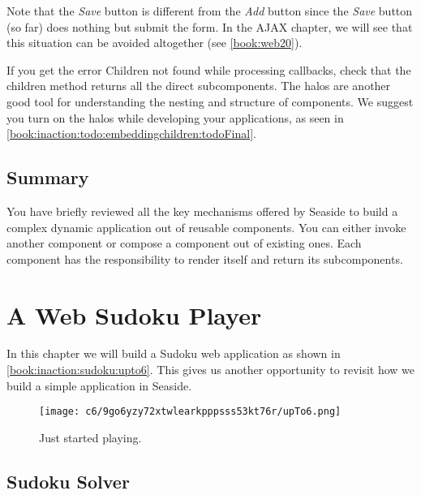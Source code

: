 \documentclass[a4paper,10pt,twoside]{book}
\newcommand{\ct}[1]{{\small\ttfamily\textup{#1}}}
\begin{document}
   
Note that the \textit{Save} button is different from the \textit{Add} button since the \textit{Save} button (so far) does nothing but submit the form. In the AJAX chapter, we will see that this situation can be avoided altogether (see \autoref{book:web20}).

If you get the error Children not found while processing callbacks, check that the \ct{children} method returns all the direct subcomponents. The halos are another good tool for understanding the nesting and structure of components. We suggest you turn on the halos while developing your applications, as seen in \autoref{book:inaction:todo:embeddingchildren:todoFinal}.

\section{Summary}
\label{book:inaction:todo:summary}

You have briefly reviewed all the key mechanisms offered by Seaside to build a complex dynamic application out of reusable components. You can either invoke another component or compose a component out of existing ones. Each component has the responsibility to render itself and return its subcomponents.

\chapter{A Web Sudoku Player}
\label{book:inaction:sudoku}

In this chapter we will build a Sudoku web application as shown in \autoref{book:inaction:sudoku:upto6}. This gives us another opportunity to revisit how we build a simple application in Seaside.

\begin{figure}[h!tbp]
	\begin{center}
		\texttt{[image: c6/9go6yzy72xtwlearkpppsss53kt76r/upTo6.png]}
		\caption{Just started playing.\label{book:inaction:sudoku:upto6}}
	\end{center}
\end{figure}


\section{Sudoku Solver}
\label{book:inaction:sudoku:solver}
\end{document}
